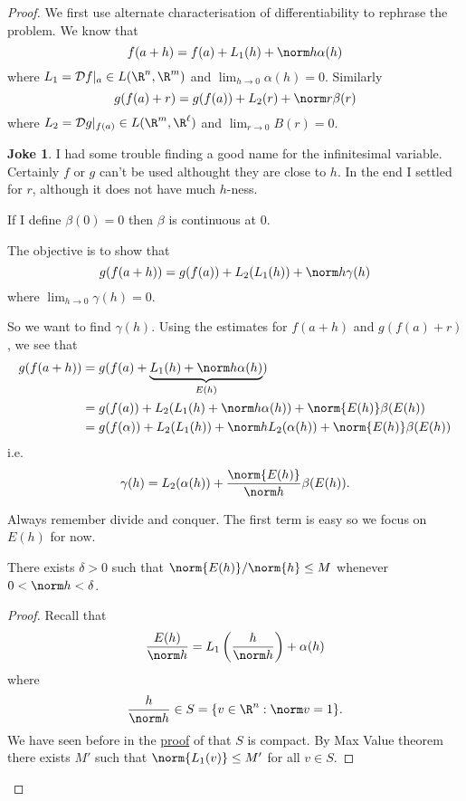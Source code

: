 \documentclass[a4paper]{article}
\newcommand*{\D}{\mathcal{D}}
\theoremstyle{definition}
\newtheorem*{joke}{Joke}
\begin{document}
\begin{proof}
  We first use alternate characterisation of differentiability to rephrase the problem. We know that
  \[
    f(a + h) = f(a) + L_1(h) + \norm h \alpha(h)
  \]
  where \(L_1 = \D f|_a \in L(\R^n, \R^m)\) and \(\lim_{h \to 0} \alpha(h) = 0\). Similarly
  \[
    g(f(a) + r) = g(f(a)) + L_2(r) + \norm r \beta(r)
  \]
  where \(L_2 = \D g|_{f(a)} \in L(\R^m, \R^\ell)\) and \(\lim_{r \to 0} B(r) = 0\).
  \begin{joke}
    I had some trouble finding a good name for the infinitesimal variable. Certainly \(f\) or \(g\) can't be used althought they are close to \(h\). In the end I settled for \(r\), although it does not have much \(h\)-ness.
  \end{joke}
  
  \begin{note}
    If I define \(\beta(0) = 0\) then \(\beta\) is continuous at \(0\).
  \end{note}

  The objective is to show that
  \[
    g(f(a + h)) = g(f(a)) + L_2(L_1(h)) + \norm h \gamma(h)
  \]
  where \(\lim_{h \to 0} \gamma(h) = 0\).

  So we want to find \(\gamma(h)\). Using the estimates for \(f(a + h)\) and \(g(f(a) + r)\), we see that
  \begin{align*}
    g(f(a + h)) &= g(f(a) + \underbrace{L_1(h) + \norm h \alpha(h)}_{E(h)}) \\
                &= g(f(a)) + L_2(L_1(h) + \norm h \alpha(h)) + \norm{E(h)} \beta(E(h)) \\
                &= g(f(\alpha)) + L_2(L_1(h)) + \norm h L_2(\alpha(h)) + \norm{E(h)} \beta(E(h)) 
  \end{align*}
  i.e.
  \[
    \gamma(h) = L_2(\alpha(h)) + \frac{\norm{E(h)}}{\norm h} \beta(E(h)).
  \]

  Always remember divide and conquer. The first term is easy so we focus on \(E(h)\) for now.

  \begin{lemma}
    There exists \(\delta > 0\) such that \(\norm{E(h)}/\norm{h} \leq M\) whenever \(0 < \norm h < \delta\).
  \end{lemma}

  \begin{proof}
    Recall that
    \[
      \frac{E(h)}{\norm h} = L_1\left( \frac{h}{\norm h} \right) + \alpha(h)
    \]
    where
    \[
      \frac{h}{\norm h} \in S = \{v \in \R^n : \norm v = 1\}.
    \]
    We have seen before in the \hyperref[proof:Lipschitz equivalence]{proof} of  that \(S\) is compact. By Max Value theorem there exists \(M'\) such that \(\norm{L_1(v)} \leq M'\) for all \(v \in S\).


\end{proof}
\end{proof}
\end{document}
